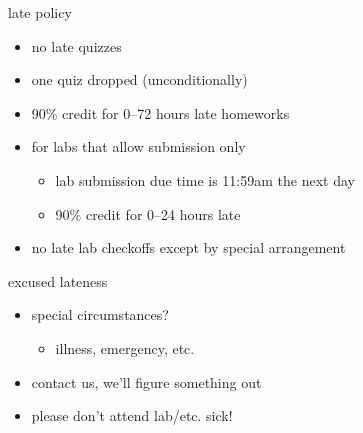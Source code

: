 
\begin{frame}{late policy}
    \begin{itemize}
    \item no late quizzes
    \item one quiz dropped (unconditionally)
    \vspace{.5cm}
    \item 90\% credit for 0--72 hours late homeworks
    \vspace{.5cm}
    \item for labs that allow submission only
        \begin{itemize}
        \item lab submission due time is 11:59am the next day
        \item 90\% credit for 0--24 hours late
        \end{itemize}
    \item no late lab checkoffs except by special arrangement
    \end{itemize}
\end{frame}


\begin{frame}{excused lateness}
    \begin{itemize}
    \item special circumstances?
        \begin{itemize}
        \item illness, emergency, etc.
        \end{itemize}
    \item contact us, we'll figure something out
    \vspace{.5cm}
    \item please don't attend lab/etc. sick!
    \end{itemize}
\end{frame}
